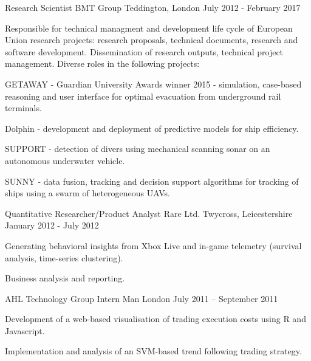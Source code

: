 \begin{cventries}
  \cventry
    {Research Scientist} %
    {BMT Group} %
    {Teddington, London} %
    {July 2012 - February 2017} %
    {  
    Responsible for technical managment and development life cycle of European Union research projects: research proposals, technical documents, research and software development. Dissemination of research outputs, technical project management. Diverse roles in the following projects:
    \vspace{.6cm}
    \begin{cvitems} 
        \item {GETAWAY - Guardian University Awards winner 2015 - simulation, case-based reasoning and user interface for optimal evacuation from underground rail terminals.}
        \item {Dolphin - development and deployment of predictive models for ship efficiency.}
        \item {SUPPORT - detection of divers using mechanical scanning sonar on an autonomous underwater vehicle.}
        \item {SUNNY - data fusion, tracking and decision support algorithms for tracking of ships using a swarm of heterogeneous UAVs.}
      \end{cvitems}
    }

  \cventry
    {Quantitative Researcher/Product Analyst} %
    {Rare Ltd.} %
    {Twycross, Leicestershire} %
    {January 2012 - July 2012} %
    {
      \begin{cvitems} %
        \item {Generating behavioral insights from Xbox Live and in-game telemetry (survival analysis, time-series clustering).}
        \item {Business analysis and reporting.}
      \end{cvitems}
    }

  \cventry
    {AHL Technology Group Intern}
    {Man}
    {London}
    {July 2011 – September 2011}
    {
      \begin{cvitems}
      \item {Development of a web-based visualisation of trading execution costs using R and Javascript.} 
      \item {Implementation and analysis of an SVM-based trend following trading strategy.}
      \end{cvitems}
    }
\end{cventries}
